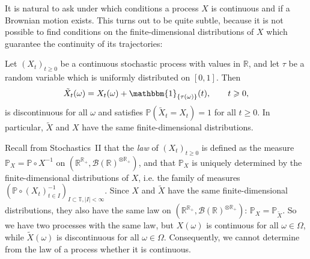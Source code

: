 \documentclass{article}
\newcommand{\emph}[1]{{\em #1\/}}
\newcommand{\1}{\mathbbm{1}}
\begin{document}
It is natural to ask under which conditions a process $X$ is continuous and if
a Brownian motion exists. This turns out to be quite subtle, because it is not
possible to find conditions on the finite-dimensional distributions of $X$
which guarantee the continuity of its trajectories:

\begin{example}
  \label{ex:discontinuous modification}Let $(X_t)_{t \geqslant 0}$ be a
  continuous stochastic process with values in $\mathbb{R}$, and let $\tau$ be
  a random variable which is uniformly distributed on $[0, 1]$. Then
  \[ \tilde{X}_t (\omega) = X_t (\omega) +\mathbbm{1}_{\{\tau (\omega) \}}
     (t), \qquad t \geqslant 0, \]
  is discontinuous for all $\omega$ and satisfies $\mathbb{P} (\tilde{X}_t =
  X_t) = 1$ for all $t \geqslant 0$. In particular, $\tilde{X}$ and $X$ have
  the same finite-dimensional distributions.

  \begin{figure}[h]
    \caption{}
  \end{figure}

  Recall from Stochastics~II that the {\emph{law}} of $(X_t)_{t \geqslant 0}$
  is defined as the measure $\mathbb{P}_X =\mathbb{P} \circ X^{- 1}$ on
  $(\mathbb{R}^{\mathbb{R}_+}, \mathcal{B} (\mathbb{R})^{{\otimes
  \mathbb{R}_+} })$, and that $\mathbb{P}_X$ is uniquely determined by the
  finite-dimensional distributions of $X$, i.e. the family of measures
  $(\mathbb{P} \circ (X_t)_{t \in I}^{- 1})_{I \subset \mathbb{T}, | I | <
  \infty}$. Since $X$ and $\tilde{X}$ have the same finite-dimensional
  distributions, they also have the same law on $(\mathbb{R}^{\mathbb{R}_+},
  \mathcal{B} (\mathbb{R})^{{\otimes \mathbb{R}_+} })$: $\mathbb{P}_X
  =\mathbb{P}_{\tilde{X}}$. So we have two processes with the same law, but $X
  (\omega)$ is continuous for all $\omega \in \Omega$, while $\tilde{X}
  (\omega)$ is discontinuous for all $\omega \in \Omega$. Consequently, we
  cannot determine from the law of a process whether it is continuous.


\end{example}
\end{document}
